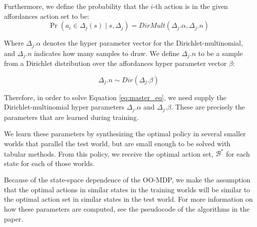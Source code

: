 \documentclass[11pt]{article}
\begin{document}
Furthermore, we define the probability that the $i$-th action is in the given affordances action set to be:
\begin{equation}
\Pr(a_i \in \Delta_j(s) \mid s, \Delta_j) = DirMult(\Delta_j.\alpha, \Delta_j.n)
\end{equation}

Where $\Delta_j.\alpha$ denotes the hyper parameter vector for the Dirichlet-multinomial, and $\Delta_j.n$ indicates how many samples to draw. We define $\Delta_j.n$ to be a sample from a Dirichlet distribution over the affordances hyper parameter vector $\beta$:

\begin{equation}
\Delta_j.n \sim Dir(\Delta_j.\beta)
\end{equation}

Therefore, in order to solve Equation \ref{eq:master_eq}, we need supply the Dirichlet-multinomial hyper parameters $\Delta_j.\alpha$ and $\Delta_j.\beta$. These are precisely the parameters that are learned during training.


We learn these parameters by synthesizing the optimal policy in several smaller worlds that parallel the test world, but are small enough to be solved with tabular methods. From this policy, we receive the optimal action set, $\mathcal{B}^*$ for each state for each of those worlds.

Because of the state-space dependence of the OO-MDP, we make the assumption that the optimal actions in similar states in the training worlds will be similar to the optimal action set in similar states in the test world. For more information on how these parameters are computed, see the pseudocode of the algorithms in the paper.

{\small

  
}
\end{document}

